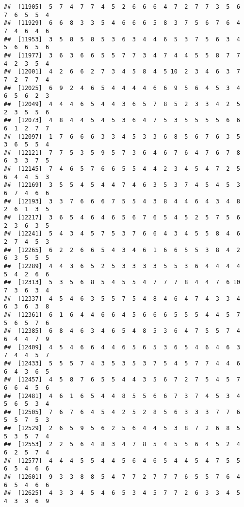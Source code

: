 \documentclass[
]{book}
\begin{document}
\begin{verbatim}
##  [11905]  5  7  4  7  7  4  5  2  6  6  6  4  7  2  7  7  3  5  6  7  6  5  5  4
##  [11929]  6  6  8  3  3  5  4  6  6  6  5  8  3  7  5  6  7  6  4  7  4  6  4  6
##  [11953]  3  5  8  5  8  5  3  6  3  4  4  6  5  3  7  5  6  3  4  5  6  6  5  6
##  [11977]  3  6  3  6  6  5  5  7  7  3  4  7  4  4  5  5  8  7  7  4  2  3  5  4
##  [12001]  4  2  6  6  2  7  3  4  5  8  4  5 10  2  3  4  6  3  7  7  2  7  7  4
##  [12025]  6  9  2  4  6  5  4  4  4  4  6  6  9  5  6  4  5  3  4  6  5  6  2  3
##  [12049]  4  4  4  6  5  4  4  3  6  5  7  8  5  2  3  3  4  2  5  2  3  5  5  6
##  [12073]  4  8  4  4  5  4  5  3  6  4  7  5  3  5  5  5  5  6  6  6  1  2  7  7
##  [12097]  1  7  6  6  6  3  3  4  5  3  3  6  8  5  6  7  6  3  5  3  6  5  5  4
##  [12121]  7  7  5  3  5  9  5  7  3  6  4  6  7  6  4  7  6  7  8  6  3  3  7  5
##  [12145]  7  4  6  5  7  6  6  5  5  4  4  2  3  4  5  4  7  2  5  6  4  4  5  3
##  [12169]  3  5  5  4  5  4  4  7  4  6  3  5  3  7  4  5  4  5  3  6  7  4  6  6
##  [12193]  3  3  7  6  6  6  7  5  5  4  3  8  4  4  6  4  3  4  8  2  6  1  3  5
##  [12217]  3  6  5  4  6  4  6  5  6  7  6  5  4  5  2  5  7  5  6  2  3  6  3  5
##  [12241]  5  4  3  4  5  7  5  3  7  6  6  4  3  4  5  5  8  4  6  2  7  4  5  3
##  [12265]  6  2  2  6  6  5  4  3  4  6  1  6  6  5  5  3  8  4  2  6  3  5  5  5
##  [12289]  4  4  3  6  5  2  5  3  3  3  3  5  5  3  6  4  4  4  4  5  4  2  6  6
##  [12313]  5  3  5  6  8  5  4  5  5  4  7  7  7  8  4  4  7  6 10  7  3  6  3  4
##  [12337]  4  5  4  6  3  5  5  7  5  4  8  4  6  4  7  4  3  3  4  6  3  6  3  8
##  [12361]  6  1  6  4  4  6  6  4  5  6  6  6  5  5  5  4  4  5  7  5  6  5  7  6
##  [12385]  6  8  4  6  3  4  6  5  4  8  5  3  6  4  7  5  5  7  4  6  4  4  7  9
##  [12409]  4  5  4  6  6  4  4  6  5  6  5  3  6  5  4  6  4  6  3  7  4  4  5  7
##  [12433]  5  5  5  7  4  3  5  3  5  3  7  5  4  5  7  7  4  4  6  6  4  3  6  5
##  [12457]  4  5  8  7  6  5  5  4  4  3  5  6  7  2  7  5  4  5  7  6  6  4  5  6
##  [12481]  4  6  1  6  5  4  4  8  5  5  6  6  7  3  7  4  5  3  4  5  6  5  3  4
##  [12505]  7  6  7  6  4  5  4  2  5  2  8  5  6  3  3  3  7  7  6  5  5  7  5  3
##  [12529]  2  6  5  9  5  6  2  5  6  4  4  5  3  8  7  2  6  8  5  5  3  5  7  4
##  [12553]  2  2  5  6  4  8  3  4  7  8  5  4  5  5  6  4  5  2  4  6  2  5  7  4
##  [12577]  4  4  4  5  5  4  4  5  6  4  6  5  4  4  5  4  7  5  5  6  5  4  6  6
##  [12601]  9  3  3  8  8  5  4  7  7  2  7  7  7  6  5  5  7  6  4  6  5  4  6  6
##  [12625]  4  3  3  4  5  4  6  5  3  4  5  7  7  2  6  3  3  4  5  4  3  3  6  9

\end{verbatim}
\end{document}
